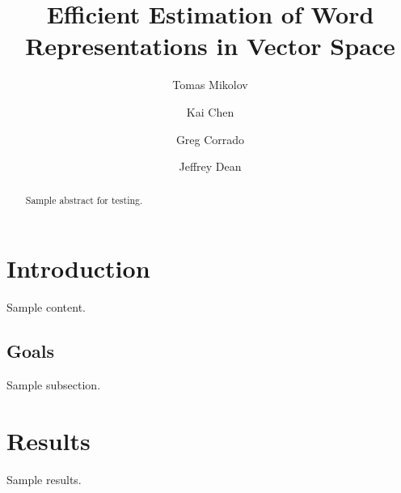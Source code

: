 \documentclass{article}
\title{Efficient Estimation of Word Representations in Vector Space}
\author{Tomas Mikolov \and Kai Chen \and Greg Corrado \and Jeffrey Dean}
\begin{document}
\maketitle
\begin{abstract}
Sample abstract for testing.
\end{abstract}
\section{Introduction}
Sample content.
\subsection{Goals}
Sample subsection.
\section{Results}
Sample results.
\end{document}
